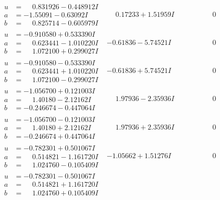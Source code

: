 \documentclass[1p]{elsarticle_modified}
\theoremstyle{definition}
\begin{document}
$$\begin{array}{c|c|c}
\begin{aligned}
u &= \phantom{-}0.831926 - 0.448912 I \\
a &= -1.55091 - 0.63092 I \\
b &= \phantom{-}0.825714 - 0.605979 I\end{aligned}
 & \phantom{-}0.17233 + 1.51959 I & \phantom{-0.000000 } 0 \\ \hline\begin{aligned}
u &= -0.910580 + 0.533390 I \\
a &= \phantom{-}0.623441 - 1.010220 I \\
b &= \phantom{-}1.072100 + 0.299027 I\end{aligned}
 & -0.61836 - 5.74521 I & \phantom{-0.000000 } 0 \\ \hline\begin{aligned}
u &= -0.910580 - 0.533390 I \\
a &= \phantom{-}0.623441 + 1.010220 I \\
b &= \phantom{-}1.072100 - 0.299027 I\end{aligned}
 & -0.61836 + 5.74521 I & \phantom{-0.000000 } 0 \\ \hline\begin{aligned}
u &= -1.056700 + 0.121003 I \\
a &= \phantom{-}1.40180 - 2.12162 I \\
b &= -0.246674 - 0.447064 I\end{aligned}
 & \phantom{-}1.97936 - 2.35936 I & \phantom{-0.000000 } 0 \\ \hline\begin{aligned}
u &= -1.056700 - 0.121003 I \\
a &= \phantom{-}1.40180 + 2.12162 I \\
b &= -0.246674 + 0.447064 I\end{aligned}
 & \phantom{-}1.97936 + 2.35936 I & \phantom{-0.000000 } 0 \\ \hline\begin{aligned}
u &= -0.782301 + 0.501067 I \\
a &= \phantom{-}0.514821 - 1.161720 I \\
b &= \phantom{-}1.024760 - 0.105409 I\end{aligned}
 & -1.05662 + 1.51276 I & \phantom{-0.000000 } 0 \\ \hline\begin{aligned}
u &= -0.782301 - 0.501067 I \\
a &= \phantom{-}0.514821 + 1.161720 I \\
b &= \phantom{-}1.024760 + 0.105409 I\end{aligned}

\end{array}$$
\end{document}
